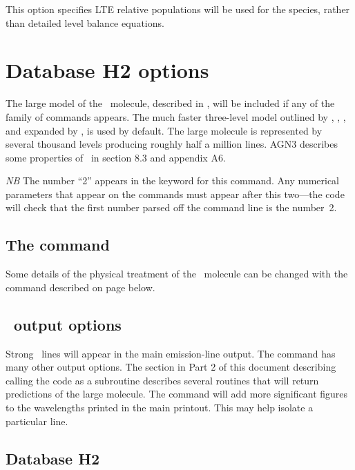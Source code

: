 This option specifies LTE relative populations will be used for the
species, rather than detailed level balance equations.


\section{Database H2 options}
\label{sec:AtomH2}

The large model of the \htwo\ molecule, described in \citet{Shaw2005},
will be included if any of the family of 
commands appears.
The much
faster three-level model outlined by \citet{Tielens1985a},
\citet{Burton1990}, \citet{Draine1996},
and expanded
by \citet{Elwert2006}, is used by default.
The large molecule is
represented by several thousand levels producing roughly half a million
lines.
AGN3 describes some properties of \htwo\ in section 8.3
and appendix A6.

\emph{NB}  The number ``2'' appears in the keyword for this command.
Any
numerical parameters that appear on the 
commands must appear after
this two---the code will check that the first number
parsed off the command line is the number~2.

\subsection{The  command}

Some details of the physical treatment of the \htwo\ molecule can be
changed with the  command described on page
\pageref{sec:SetH2} below.

\subsection{\htwo\ output options}

Strong \htwo\ lines will appear in the main emission-line output.
The  command has many other output options.
The
section in Part 2 of this document describing calling the code as a
subroutine describes several routines that will return predictions of the
large molecule.
The  command
will add more significant figures to the wavelengths printed in the main
printout.
This may help isolate a particular line.

\subsection{Database H2}

